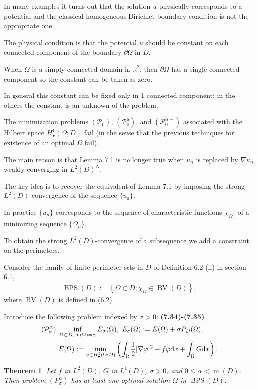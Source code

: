 \documentclass{book}
\numberwithin{equation}{section}
\newtheorem{theorem}{Theorem}[section]
\begin{document}
\begin{enumerate}
    In many examples it turns out that the solution $u$ physically corresponds to a potential and the classical homogeneous Dirichlet boundary condition is not the appropriate one.
    
    The physical condition is that the potential $u$ should be constant on each connected component of the boundary $\partial\Omega$ in $D$.
    
    When $\Omega$ is a simply connected domain in $\mathbb{R}^2$, then $\partial\Omega$ has a single connected component so the constant can be taken as zero.
    
    In general this constant can be fixed only in 1 connected component; in the others the constant is an unknown of the problem.
    
    The minimization problems $(\mathcal{P}_0)$, $(\mathcal{P}_0^\alpha)$, and $(\mathcal{P}_0^{\alpha-})$ associated with the Hilbert space $H_\bullet^1(\Omega;D)$ fail (in the sense that the previous techniques for existence of an optimal $\Omega$ fail).
    
    The main reason is that Lemma 7.1 is no longer true when $u_n$ is replaced by $\nabla u_n$ weakly converging in $L^2(D)^N$.
    
    The key idea is to recover the equivalent of Lemma 7.1 by imposing the strong $L^2(D)$-convergence of the sequence $\{u_n\}$.
    
    In practice $\{u_n\}$ corresponds to the sequence of characteristic functions $\chi_{\Omega_n}$ of a minimizing sequence $\{\Omega_n\}$.
    
    To obtain the strong $L^2(D)$-convergence of a subsequence we add a constraint on the perimeters.
    
    Consider the family of finite perimeter sets in $D$ of Definition 6.2 (ii) in section 6.1,
    \begin{align*}
        \operatorname{BPS}(D) := \left\{\Omega\subset D;\chi_\Omega\in\operatorname{BV}(D)\right\},
    \end{align*}
    where $\operatorname{BV}(D)$ is defined in (6.2).
    
    Introduce the following problem indexed by $\sigma > 0$: \textbf{(7.34)-(7.35)}
    \begin{align*}
        (\mathcal{P}_\sigma^\alpha)\ &\inf_{\Omega\subset D,\,\operatorname{m}(\Omega) = \alpha} E_\sigma(\Omega),\ E_\sigma(\Omega) := E(\Omega) + \sigma P_D(\Omega),\\
        &E(\Omega) := \min_{\varphi\in H_\bullet^1(\Omega;D)} \left(\int_\Omega \frac{1}{2}|\nabla\varphi|^2 - f\varphi{\rm d}x + \int_\Omega G{\rm d}x\right).
    \end{align*}
    
    \begin{theorem}
        Let $f$ in $L^2(D)$, $G$ in $L^1(D)$, $\sigma > 0$, and $0\le\alpha < \operatorname{m}(D)$. Then problem $(P_\sigma^\alpha)$ has at least one optimal solution $\Omega$ in $\operatorname{BPS}(D)$.
    \end{theorem}    
\end{enumerate}
\end{document}
